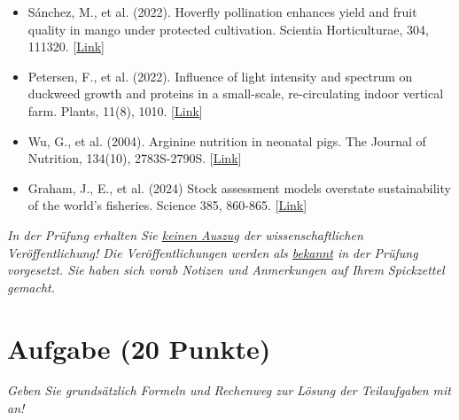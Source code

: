 \documentclass[a4paper, 9pt]{scrartcl}\usepackage[]{graphicx}\usepackage[]{xcolor}
\begin{document}
\begin{itemize}[noitemsep]
\item Sánchez, M., et al. (2022). Hoverfly pollination enhances yield and fruit quality in mango under protected cultivation. Scientia Horticulturae, 304, 111320. [\href{https://www.sciencedirect.com/science/article/pii/S0304423822004411}{Link}]
\item Petersen, F., et al. (2022). Influence of light intensity and spectrum on duckweed growth and proteins in a small-scale, re-circulating indoor vertical farm. Plants, 11(8), 1010. [\href{https://www.mdpi.com/2223-7747/11/8/1010}{Link}]
\item Wu, G., et al. (2004). Arginine nutrition in neonatal pigs. The Journal of Nutrition, 134(10), 2783S-2790S. [\href{https://www.sciencedirect.com/science/article/pii/S0022316623031279}{Link}]
\item Graham, J., E., et al. (2024) Stock assessment models overstate sustainability of the world’s fisheries. Science 385, 860-865. [\href{https://www.science.org/doi/10.1126/science.adl6282}{Link}]
\end{itemize}

\textit{In der Prüfung erhalten Sie \underline{keinen Auszug} der wissenschaftlichen Veröffentlichung! Die Veröffentlichungen werden als \underline{bekannt} in der Prüfung vorgesetzt. Sie haben sich vorab Notizen und Anmerkungen auf Ihrem Spickzettel gemacht.}

\clearpage

\section{Aufgabe \hfill (20 Punkte)}

\textit{Geben Sie grundsätzlich Formeln und Rechenweg zur Lösung der Teilaufgaben mit an!} \\[1Ex]
 
\end{document}
